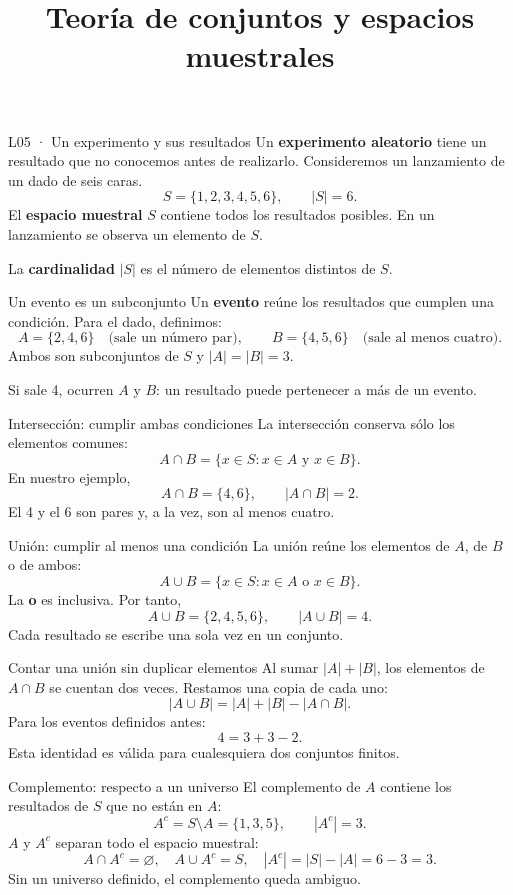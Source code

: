 \documentclass[aspectratio=169,11pt,spanish]{beamer}
\title[L05 · Fundamentos]{Teoría de conjuntos y espacios muestrales}
\begin{document}
\begin{frame}{L05 · Un experimento y sus resultados}
Un \textbf{experimento aleatorio} tiene un resultado que no conocemos antes de realizarlo.
Consideremos un lanzamiento de un dado de seis caras.
\[
S=\{1,2,3,4,5,6\},\qquad |S|=6.
\]
El \textbf{espacio muestral} $S$ contiene todos los resultados posibles. En un lanzamiento se observa un elemento de $S$.

\medskip
La \textbf{cardinalidad} $|S|$ es el número de elementos distintos de $S$.
\end{frame}
\begin{frame}{Un evento es un subconjunto}
Un \textbf{evento} reúne los resultados que cumplen una condición. Para el dado, definimos:
\[
A=\{2,4,6\}\quad\text{(sale un número par)},\qquad
B=\{4,5,6\}\quad\text{(sale al menos cuatro)}.
\]
Ambos son subconjuntos de $S$ y $|A|=|B|=3$.

\medskip
Si sale 4, ocurren $A$ y $B$: un resultado puede pertenecer a más de un evento.
\end{frame}
\begin{frame}{Intersección: cumplir ambas condiciones}
La intersección conserva sólo los elementos comunes:
\[
A\cap B=\{x\in S:x\in A\text{ y }x\in B\}.
\]
En nuestro ejemplo,
\[
A\cap B=\{4,6\},\qquad |A\cap B|=2.
\]
El 4 y el 6 son pares y, a la vez, son al menos cuatro.
\end{frame}
\begin{frame}{Unión: cumplir al menos una condición}
La unión reúne los elementos de $A$, de $B$ o de ambos:
\[
A\cup B=\{x\in S:x\in A\text{ o }x\in B\}.
\]
La \textbf{o} es inclusiva. Por tanto,
\[
A\cup B=\{2,4,5,6\},\qquad |A\cup B|=4.
\]
Cada resultado se escribe una sola vez en un conjunto.
\end{frame}
\begin{frame}{Contar una unión sin duplicar elementos}
Al sumar $|A|+|B|$, los elementos de $A\cap B$ se cuentan dos veces. Restamos una copia de cada uno:
\[
|A\cup B|=|A|+|B|-|A\cap B|.
\]
Para los eventos definidos antes:
\[
4=3+3-2.
\]
Esta identidad es válida para cualesquiera dos conjuntos finitos.
\end{frame}
\begin{frame}{Complemento: respecto a un universo}
El complemento de $A$ contiene los resultados de $S$ que no están en $A$:
\[
A^c=S\setminus A=\{1,3,5\},\qquad |A^c|=3.
\]
$A$ y $A^c$ separan todo el espacio muestral:
\[
A\cap A^c=\varnothing,\quad A\cup A^c=S,\quad
|A^c|=|S|-|A|=6-3=3.
\]
Sin un universo definido, el complemento queda ambiguo.
\end{frame}
\end{document}
